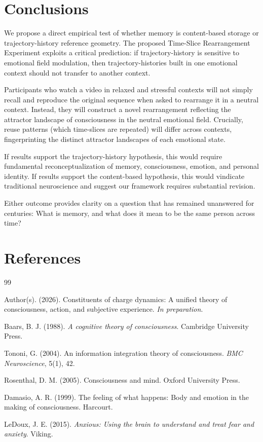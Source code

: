 \documentclass[12pt,a4paper]{article}
\theoremstyle{definition}
\begin{document}
\section{Conclusions}

We propose a direct empirical test of whether memory is content-based storage or trajectory-history reference geometry. The proposed Time-Slice Rearrangement Experiment exploits a critical prediction: if trajectory-history is sensitive to emotional field modulation, then trajectory-histories built in one emotional context should not transfer to another context.

Participants who watch a video in relaxed and stressful contexts will not simply recall and reproduce the original sequence when asked to rearrange it in a neutral context. Instead, they will construct a novel rearrangement reflecting the attractor landscape of consciousness in the neutral emotional field. Crucially, reuse patterns (which time-slices are repeated) will differ across contexts, fingerprinting the distinct attractor landscapes of each emotional state.

If results support the trajectory-history hypothesis, this would require fundamental reconceptualization of memory, consciousness, emotion, and personal identity. If results support the content-based hypothesis, this would vindicate traditional neuroscience and suggest our framework requires substantial revision.

Either outcome provides clarity on a question that has remained unanswered for centuries: What is memory, and what does it mean to be the same person across time?

\newpage

\section*{References}

\begin{thebibliography}{99}

 Author(s). (2026). Constituents of charge dynamics: A unified theory of consciousness, action, and subjective experience. \textit{In preparation}.

 Baars, B. J. (1988). \textit{A cognitive theory of consciousness}. Cambridge University Press.

 Tononi, G. (2004). An information integration theory of consciousness. \textit{BMC Neuroscience}, 5(1), 42.

 Rosenthal, D. M. (2005). Consciousness and mind. Oxford University Press.

 Damasio, A. R. (1999). The feeling of what happens: Body and emotion in the making of consciousness. Harcourt.

 LeDoux, J. E. (2015). \textit{Anxious: Using the brain to understand and treat fear and anxiety}. Viking.

\end{thebibliography}
\end{document}
